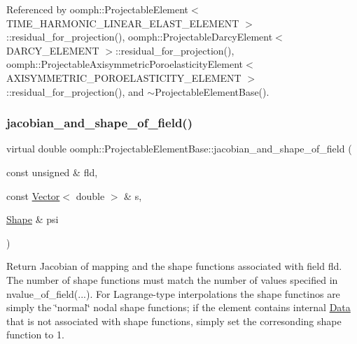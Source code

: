 Referenced by oomph\+::\+Projectable\+Element$<$ T\+I\+M\+E\+\_\+\+H\+A\+R\+M\+O\+N\+I\+C\+\_\+\+L\+I\+N\+E\+A\+R\+\_\+\+E\+L\+A\+S\+T\+\_\+\+E\+L\+E\+M\+E\+N\+T $>$\+::residual\+\_\+for\+\_\+projection(), oomph\+::\+Projectable\+Darcy\+Element$<$ D\+A\+R\+C\+Y\+\_\+\+E\+L\+E\+M\+E\+N\+T $>$\+::residual\+\_\+for\+\_\+projection(), oomph\+::\+Projectable\+Axisymmetric\+Poroelasticity\+Element$<$ A\+X\+I\+S\+Y\+M\+M\+E\+T\+R\+I\+C\+\_\+\+P\+O\+R\+O\+E\+L\+A\+S\+T\+I\+C\+I\+T\+Y\+\_\+\+E\+L\+E\+M\+E\+N\+T $>$\+::residual\+\_\+for\+\_\+projection(), and $\sim$\+Projectable\+Element\+Base().

\mbox{\label{classoomph_1_1ProjectableElementBase_ad45c21b58c0985d52f68ab2d79cbb488}} 
\subsubsection{\texorpdfstring{jacobian\+\_\+and\+\_\+shape\+\_\+of\+\_\+field()}{jacobian\_and\_shape\_of\_field()}}
{\footnotesize\ttfamily virtual double oomph\+::\+Projectable\+Element\+Base\+::jacobian\+\_\+and\+\_\+shape\+\_\+of\+\_\+field (\begin{DoxyParamCaption}\item[{const unsigned \&}]{fld,  }\item[{const \hyperlink{classoomph_1_1Vector}{Vector}$<$ double $>$ \&}]{s,  }\item[{\hyperlink{classoomph_1_1Shape}{Shape} \&}]{psi }\end{DoxyParamCaption})\hspace{0.3cm}{\ttfamily [pure virtual]}}



Return Jacobian of mapping and the shape functions associated with field fld. The number of shape functions must match the number of values specified in nvalue\+\_\+of\+\_\+field(...). For Lagrange-\/type interpolations the shape functinos are simply the \char`\"{}normal\char`\"{} nodal shape functions; if the element contains internal \hyperlink{classoomph_1_1Data}{Data} that is not associated with shape functions, simply set the corresonding shape function to 1. 




